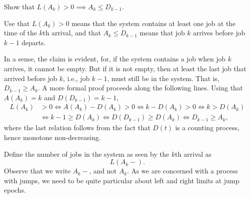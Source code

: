 \begin{extra} Show that $L(A_k)>0 \implies A_k \leq D_{k-1}$.
\begin{hint} Use that $L(A_k)>0$ means that the system contains at least one job at the time of the $k$th arrival, and that $A_k \leq D_{k-1}$ means that job $k$ arrives before job $k-1$ departs.
\end{hint}
\begin{solution} In a sense, the claim is evident, for, if the system contains a job when job $k$ arrives, it cannot be empty.
 But if it is not empty, then at least the last job that arrived before job $k$, i.e., job $k-1$, must still be in the system.
 That is, $D_{k-1} \geq A_k$.
 A more formal proof proceeds along the following lines.
 Using that $A(A_k) = k$ and $D(D_{k-1})= k-1$,
 \begin{equation*}
 \begin{split}
 L(A_k) &> 0 \Leftrightarrow A(A_k) - D(A_k) > 0 \Leftrightarrow k - D(A_k) > 0 \Leftrightarrow k > D(A_k) \\
 &\Leftrightarrow k-1 \geq D(A_k) \Leftrightarrow D(D_{k-1}) \geq D(A_k) \Leftrightarrow D_{k-1} \geq A_k, 
 \end{split}
 \end{equation*}
 where the last relation follows from the fact that $D(t)$ is a
 counting process, hence monotone non-decreasing.
\end{solution}
\end{extra}

Define the number of jobs in the system as seen by the $k$th arrival as
\begin{equation}
 \label{eq:Lk}
 L(A_k-).
\end{equation}
Observe that we write $A_k-$, and not $A_k$.
As we are concerned with a process with jumps, we need to be quite particular about left and right limits at jump epochs.

